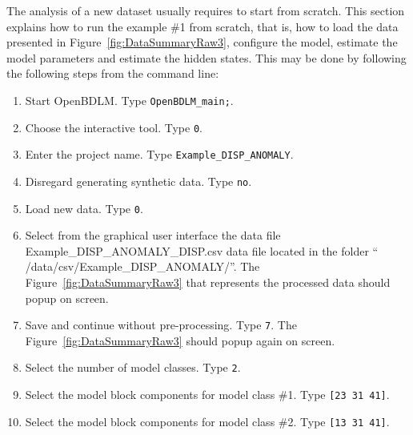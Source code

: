 The analysis of a new dataset usually requires to start from scratch.
This section explains how to run the example \#1 from scratch, that is, how to load the data presented in Figure~\ref{fig:DataSummaryRaw3}, configure the model, estimate the model parameters and estimate the hidden states.
This may be done by following the following steps from the \MATLAB{} command line:
\begin{enumerate}
\item Start OpenBDLM. Type \colorbox{light-gray}{\lstinline[basicstyle = \mlttfamily \small, backgroundcolor = \color{light-gray}]!OpenBDLM_main;!}.
\item Choose the interactive tool. Type \colorbox{light-gray}{\lstinline[basicstyle = \mlttfamily \small, backgroundcolor = \color{light-gray}]!0!}.
\item Enter the project name. Type \colorbox{light-gray}{\lstinline[basicstyle = \mlttfamily \small, backgroundcolor = \color{light-gray}]!Example_DISP_ANOMALY!}. 
\item Disregard generating synthetic data. Type \colorbox{light-gray}{\lstinline[basicstyle = \mlttfamily \small, backgroundcolor = \color{light-gray}]!no!}. 
\item Load new data. Type \colorbox{light-gray}{\lstinline[basicstyle = \mlttfamily \small, backgroundcolor = \color{light-gray}]!0!}.
\item Select from the graphical user interface the data file Example\_DISP\_ANOMALY\_DISP.csv data file located in the folder `` /data/csv/Example\_DISP\_ANOMALY/''. The Figure~\ref{fig:DataSummaryRaw3} that represents the processed data should popup on screen.
\item Save and continue without pre-processing. Type \colorbox{light-gray}{\lstinline[basicstyle = \mlttfamily \small, backgroundcolor = \color{light-gray}]!7!}. The Figure~\ref{fig:DataSummaryRaw3} should popup again on screen.
\item Select the number of model classes. Type \colorbox{light-gray}{\lstinline[basicstyle = \mlttfamily \small, backgroundcolor = \color{light-gray}]!2!}. 
\item Select the model block components for model class \#1. Type \colorbox{light-gray}{\lstinline[basicstyle = \mlttfamily \small, backgroundcolor = \color{light-gray}]![23 31 41]!}.
\item Select the model block components for model class \#2. Type \colorbox{light-gray}{\lstinline[basicstyle = \mlttfamily \small, backgroundcolor = \color{light-gray}]![13 31 41]!}.

\end{enumerate}
